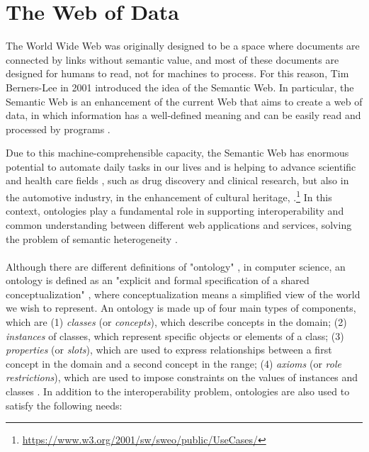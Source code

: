 \section{The Web of Data}
\label{sec:web-of-data}

The World Wide Web was originally designed to be a space where documents are connected by links without semantic value, and most of these documents are designed for humans to read, not for machines to process. For this reason, Tim Berners-Lee in 2001 introduced the idea of the Semantic Web. In particular, the Semantic Web is an enhancement of the current Web that aims to create a web of data, in which information has a well-defined meaning and can be easily read and processed by programs \cite{berners2001semantic}.

Due to this machine-comprehensible capacity, the Semantic Web has enormous potential to automate daily tasks in our lives and is helping to advance scientific and health care fields \cite{feigenbaum2007semantic}, such as drug discovery and clinical research, but also in the automotive industry, in the enhancement of cultural heritage, \etc.\footnote{\url{https://www.w3.org/2001/sw/sweo/public/UseCases/}} In this context, ontologies play a fundamental role in supporting interoperability and common understanding between different web applications and services, solving the problem of semantic heterogeneity \cite{taye2010understanding}.

\paragraph*{}
Although there are different definitions of "ontology" \cite{taye2010understanding}, in computer science, an ontology is defined as an "explicit and formal specification of a shared conceptualization" \cite{gruber1995toward}, where conceptualization means a simplified view of the world we wish to represent. An ontology is made up of four main types of components, which are (1) \textit{classes} (or \textit{concepts}), which describe concepts in the domain; (2) \textit{instances} of classes, which represent specific objects or elements of a class; (3) \textit{properties} (or \textit{slots}), which are used to express relationships between a first concept in the domain and a second concept in the range; (4) \textit{axioms} (or \textit{role restrictions}), which are used to impose constraints on the values of instances and classes \cite{taye2010understanding, noy2001ontology}. In addition to the interoperability problem, ontologies are also used to satisfy the following needs:

